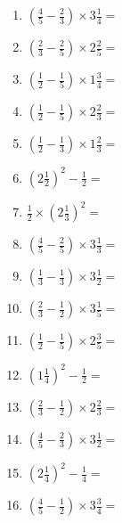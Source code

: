 \documentclass[12pt]{article}
\begin{document}
\begin{enumerate}
\newpage
\item \large $ \left( \frac{4}{5} - \frac{2}{3} \right) \times 3 \frac{1}{4} = $ \vspace{1.6cm}
\item \large $ \left( \frac{2}{3} - \frac{2}{5} \right) \times 2 \frac{2}{5} = $ \vspace{1.6cm}
\item \large $ \left( \frac{1}{2} - \frac{1}{5} \right) \times 1 \frac{3}{4} = $ \vspace{1.6cm}
\item \large $ \left( \frac{1}{2} - \frac{1}{5} \right) \times 2 \frac{2}{3} = $ \vspace{1.6cm}
\item \large $ \left( \frac{1}{2} - \frac{1}{3} \right) \times 1 \frac{2}{3} = $ \vspace{1.6cm}
\item \large $ \left( 2 \frac{1}{2} \right)^2 - \frac{1}{2} = $ \vspace{1.6cm}
\item \large $ \frac{1}{2} \times \left( 2 \frac{1}{3} \right)^2 = $ \vspace{1.6cm}
\item \large $ \left( \frac{4}{5} - \frac{2}{5} \right) \times 3 \frac{1}{3} = $ \vspace{1.6cm}
\item \large $ \left( \frac{1}{3} - \frac{1}{3} \right) \times 3 \frac{1}{2} = $ \vspace{1.6cm}
\item \large $ \left( \frac{2}{3} - \frac{1}{2} \right) \times 3 \frac{1}{5} = $ \vspace{1.6cm}
\newpage
\item \large $ \left( \frac{1}{2} - \frac{1}{5} \right) \times 2 \frac{3}{5} = $ \vspace{1.6cm}
\item \large $ \left( 1 \frac{1}{4} \right)^2 - \frac{1}{2} = $ \vspace{1.6cm}
\item \large $ \left( \frac{2}{3} - \frac{1}{2} \right) \times 2 \frac{2}{3} = $ \vspace{1.6cm}
\item \large $ \left( \frac{4}{5} - \frac{2}{3} \right) \times 3 \frac{1}{2} = $ \vspace{1.6cm}
\item \large $ \left( 2 \frac{1}{4} \right)^2 - \frac{1}{4} = $ \vspace{1.6cm}
\item \large $ \left( \frac{4}{5} - \frac{1}{2} \right) \times 3 \frac{3}{4} = $ \vspace{1.6cm}

\end{enumerate}
\end{document}
